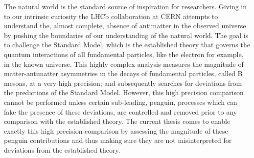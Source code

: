 The natural world is the standard source of inspiration for researchers. Giving in to
our intrinsic curiosity the LHCb collaboration at CERN attempts to understand
the, almost complete, absence of antimatter in the observed universe by pushing the boundaries
of our understanding of the natural world. The goal is to challenge the Standard Model,
which is the established theory that governs the quantum interactions of all fundamental particles,
like the electron for example, in the known universe. This highly complex analysis measures the magnitude of
matter-antimatter asymmetries in the decays of fundamental particles, called B mesons,
at a very high precision; and subsequently searches for deviations from the predictions of the Standard Model.
However, this high precision comparison cannot be performed unless certain sub-leading,
penguin, processes which can fake the presence of these deviations, are controlled
and removed prior to any comparison with the established theory. The current thesis comes
to enable exactly this high precision comparison by assessing the magnitude of these penguin
contributions and thus making sure they are not misinterpreted for deviations from the established theory.

